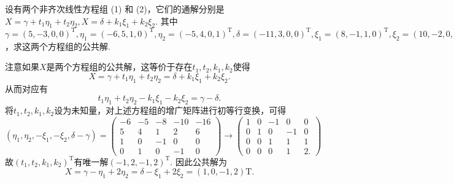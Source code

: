 \begin{exercise}
\begin{exgroup}
        \item 设有两个非齐次线性方程组 (1) 和 (2)，它们的通解分别是$X=\gamma+t_1\eta_1+t_2\eta_2, X=\delta+k_1\xi_1+k_2\xi_2$. 其中$\gamma=(5,-3,0,0)^\mathrm{T},\eta_1=(-6,5,1,0)^\mathrm{T},\eta_2=(-5,4,0,1)^\mathrm{T},\delta=(-11,3,0,0)^\mathrm{T},\xi_1=(8,-1,1,0)^\mathrm{T},\xi_2=(10,-2,0,1)^\mathrm{T}$，求这两个方程组的公共解.
        \begin{answer}
            注意如果$X$是两个方程组的公共解，这等价于存在$t_1,t_2,k_1,k_2$使得
          \[ X=\gamma+t_1\eta_1+t_2\eta_2=\delta+k_1\xi_1+k_2\xi_2. \]
          从而对应有
          \[ t_1\eta_1+t_2\eta_2-k_1\xi_1-k_2\xi_2=\gamma-\delta. \]
          将$t_1,t_2,k_1,k_2$设为未知量，对上述方程组的增广矩阵进行初等行变换，可得
          \[ (\eta_1,\eta_2,-\xi_1,-\xi_2,\delta-\gamma)=
              \begin{pmatrix}
                  -6 & -5 & -8 & -10 & -16 \\
                  5  & 4  & 1  & 2   & 6   \\
                  1  & 0  & -1 & 0   & 0   \\
                  0  & 1  & 0  & -1  & 0
              \end{pmatrix}\rightarrow
              \begin{pmatrix}
                  1 & 0 & -1 & 0  & 0  \\
                  0 & 1 & 0  & -1 & 0  \\
                  0 & 0 & 1  & 1  & 1  \\
                  0 & 0 & 0  & 1  & 2.
              \end{pmatrix} \]
          故$(t_1,t_2,k_1,k_2)^\mathrm{T}$有唯一解$(-1,2,-1,2)^\mathrm{T}$. 因此公共解为
          \[ X=\gamma-\eta_1+2\eta_2=\delta-\xi_1+2\xi_2=(1,0,-1,2)\mathrm{T}. \]
        \end{answer}


\end{exgroup}
\end{exercise}
